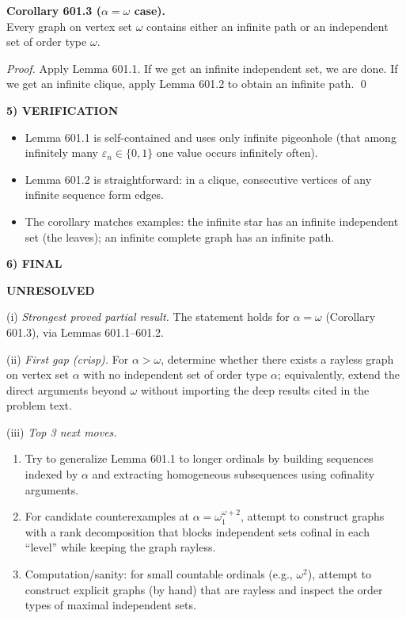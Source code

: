 \medskip
\noindent\textbf{Corollary 601.3 ($\alpha=\omega$ case).}\\
Every graph on vertex set $\omega$ contains either an infinite path or an independent set of order type $\omega$.

\noindent\emph{Proof.} Apply Lemma 601.1. If we get an infinite independent set, we are done. If we get an infinite clique, apply Lemma 601.2 to obtain an infinite path. \qed

\noindent\textbf{5) VERIFICATION}\par
\begin{itemize}
\item Lemma 601.1 is self-contained and uses only infinite pigeonhole (that among infinitely many $\varepsilon_n\in\{0,1\}$ one value occurs infinitely often).
\item Lemma 601.2 is straightforward: in a clique, consecutive vertices of any infinite sequence form edges.
\item The corollary matches examples: the infinite star has an infinite independent set (the leaves); an infinite complete graph has an infinite path.
\end{itemize}

\noindent\textbf{6) FINAL}\par
\textbf{UNRESOLVED}

(i) \emph{Strongest proved partial result.} The statement holds for $\alpha=\omega$ (Corollary 601.3), via Lemmas 601.1--601.2.

(ii) \emph{First gap (crisp).} For $\alpha>\omega$, determine whether there exists a rayless graph on vertex set $\alpha$ with no independent set of order type $\alpha$; equivalently, extend the direct arguments beyond $\omega$ without importing the deep results cited in the problem text.

(iii) \emph{Top 3 next moves.}
\begin{enumerate}
\item Try to generalize Lemma 601.1 to longer ordinals by building sequences indexed by $\alpha$ and extracting homogeneous subsequences using cofinality arguments.
\item For candidate counterexamples at $\alpha=\omega_1^{\omega+2}$, attempt to construct graphs with a rank decomposition that blocks independent sets cofinal in each ``level'' while keeping the graph rayless.
\item Computation/sanity: for small countable ordinals (e.g., $\omega^2$), attempt to construct explicit graphs (by hand) that are rayless and inspect the order types of maximal independent sets.
\end{enumerate}


